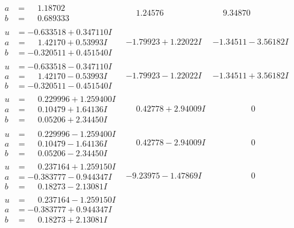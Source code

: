 \documentclass[1p]{elsarticle_modified}
\theoremstyle{definition}
\begin{document}
$$\begin{array}{c|c|c}
\begin{aligned}
a &= \phantom{-}1.18702\phantom{ +0.000000I} \\
b &= \phantom{-}0.689333\phantom{ +0.000000I}\end{aligned}
 & \phantom{-}1.24576\phantom{ +0.000000I} & \phantom{-}9.34870\phantom{ +0.000000I} \\ \hline\begin{aligned}
u &= -0.633518 + 0.347110 I \\
a &= \phantom{-}1.42170 + 0.53993 I \\
b &= -0.320511 + 0.451540 I\end{aligned}
 & -1.79923 + 1.22022 I & -1.34511 - 3.56182 I \\ \hline\begin{aligned}
u &= -0.633518 - 0.347110 I \\
a &= \phantom{-}1.42170 - 0.53993 I \\
b &= -0.320511 - 0.451540 I\end{aligned}
 & -1.79923 - 1.22022 I & -1.34511 + 3.56182 I \\ \hline\begin{aligned}
u &= \phantom{-}0.229996 + 1.259400 I \\
a &= \phantom{-}0.10479 + 1.64136 I \\
b &= \phantom{-}0.05206 + 2.34450 I\end{aligned}
 & \phantom{-}0.42778 + 2.94009 I & \phantom{-0.000000 } 0 \\ \hline\begin{aligned}
u &= \phantom{-}0.229996 - 1.259400 I \\
a &= \phantom{-}0.10479 - 1.64136 I \\
b &= \phantom{-}0.05206 - 2.34450 I\end{aligned}
 & \phantom{-}0.42778 - 2.94009 I & \phantom{-0.000000 } 0 \\ \hline\begin{aligned}
u &= \phantom{-}0.237164 + 1.259150 I \\
a &= -0.383777 - 0.944347 I \\
b &= \phantom{-}0.18273 - 2.13081 I\end{aligned}
 & -9.23975 - 1.47869 I & \phantom{-0.000000 } 0 \\ \hline\begin{aligned}
u &= \phantom{-}0.237164 - 1.259150 I \\
a &= -0.383777 + 0.944347 I \\
b &= \phantom{-}0.18273 + 2.13081 I\end{aligned}

\end{array}$$
\end{document}
